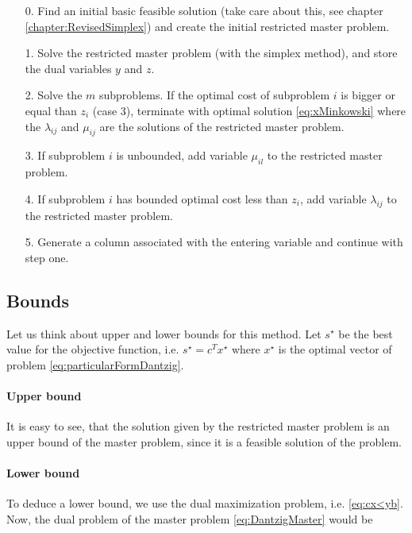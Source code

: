 \documentclass[a4paper,12pt]{article}
\begin{document}
\begin{itemize}
\item[0.] Find an initial basic feasible solution (take care about this, see chapter \ref{chapter:RevisedSimplex}) and create the initial restricted master problem. 
\item[1.] Solve the restricted master problem (with the simplex method), and store the dual variables $y$ and $z$.
\item[2.] Solve the $m$ subproblems.
If the optimal cost of subproblem $i$ is bigger or equal than $z_i$ (case 3), terminate with optimal solution \eqref{eq:xMinkowski} where the $\lambda_{ij}$ and $\mu_{ij}$ are the solutions of the restricted master problem.
\item[3.] If subproblem $i$ is unbounded, add variable $\mu_{il}$ to the restricted master problem.
\item[4.] If subproblem $i$ has bounded optimal cost less than $z_i$, add variable $\lambda_{ij}$ to the restricted master problem.
\item[5.] Generate a column associated with the entering variable and continue with step one. 
\end{itemize}

\newpage

\subsection{Bounds}

Let us think about upper and lower bounds for this method. Let $s^\star$ be the  best value for the objective function, i.e. $s^\star = c^Tx^\star$ where $x^\star$ is the optimal vector of problem \eqref{eq:particularFormDantzig}.

\paragraph*{Upper bound}

It is easy to see, that the solution given by the restricted master problem is an upper bound of the master problem, since it is a feasible solution of the problem. 

\paragraph*{Lower bound}

To deduce a lower bound, we use the dual maximization problem, i.e. \eqref{eq:cx<yb}.
Now, the dual problem of the master problem \eqref{eq:DantzigMaster} would be
\end{document}
